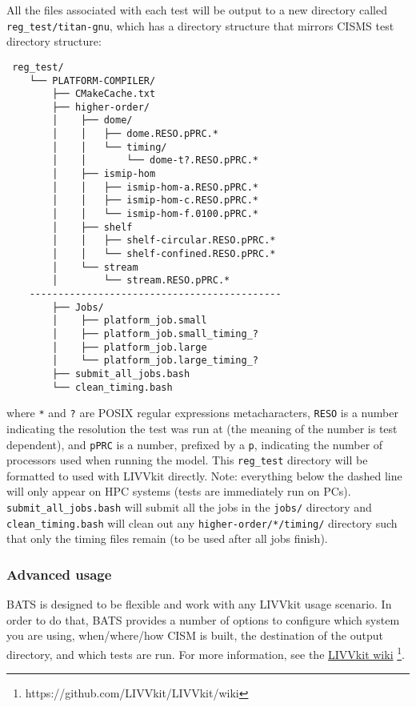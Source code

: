 \par
All the files associated with each test will be output to a new directory called \texttt{reg\_test/titan-gnu}, which has a
directory structure that mirrors CISMS test directory structure:

\begin{verbatim}
 reg_test/
    └── PLATFORM-COMPILER/
        ├── CMakeCache.txt
        ├── higher-order/
        │    ├── dome/
        │    │   ├── dome.RESO.pPRC.*
        │    │   └── timing/
        │    │       └── dome-t?.RESO.pPRC.*
        │    ├── ismip-hom
        │    │   ├── ismip-hom-a.RESO.pPRC.*
        │    │   ├── ismip-hom-c.RESO.pPRC.*
        │    │   └── ismip-hom-f.0100.pPRC.*
        │    ├── shelf
        │    │   ├── shelf-circular.RESO.pPRC.*
        │    │   └── shelf-confined.RESO.pPRC.*
        │    └── stream
        │        └── stream.RESO.pPRC.*
    --------------------------------------------
        ├── Jobs/
        │    ├── platform_job.small
        │    ├── platform_job.small_timing_?
        │    ├── platform_job.large
        │    └── platform_job.large_timing_?
        ├── submit_all_jobs.bash
        └── clean_timing.bash
\end{verbatim}

\noindent
where \texttt{*} and \texttt{?} are POSIX regular expressions metacharacters, \texttt{RESO} is a number indicating the
resolution the test was run at (the meaning of the number is test dependent), and \texttt{pPRC} is a number, prefixed by
a \texttt{p}, indicating the number of processors used when running the model. This \texttt{reg\_test} directory will be
formatted to used with LIVVkit directly. Note: everything below the dashed line will only appear on HPC systems (tests
are immediately run on PCs).  \texttt{submit\_all\_jobs.bash} will submit all the jobs in the \texttt{jobs/} directory
and \texttt{clean\_timing.bash} will clean out any \texttt{higher-order/*/timing/} directory such that only the timing
files remain (to be used after all jobs finish).

\subsubsection{Advanced usage}
    
BATS is designed to be flexible and work with any LIVVkit usage scenario. In order to do that, BATS provides a number of
options to configure which system you are using, when/where/how CISM is built, the destination of the output directory,
and which tests are run. For more information, see the \href{https://github.com/LIVVkit/LIVVkit/wiki}{LIVVkit wiki}
\footnote{https://github.com/LIVVkit/LIVVkit/wiki}. 



